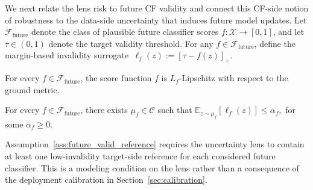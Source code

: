 



We next relate the lens risk to future CF validity and connect this
CF-side notion of robustness to the data-side uncertainty that induces
future model updates.
Let $\mathcal{F}_{\mathrm{future}}$ denote the class of plausible future
classifier scores $f:\mathcal{X}\to[0,1]$, and let
$\tau\in(0,1)$ denote the target validity threshold.
For any $f\in\mathcal{F}_{\mathrm{future}}$, define the margin-based
invalidity surrogate
$\
    \ell_f(z)
    :=
    [\tau-f(z)]_+.
    \label{eq:invalidity_surrogate}
$

\begin{assumption}
\label{ass:lipschitz_future}
For every $f\in\mathcal{F}_{\mathrm{future}}$, the score function $f$ is
$L_f$-Lipschitz with respect to the ground metric.
\end{assumption}

\begin{assumption}
\label{ass:future_valid_reference}
For every $f\in\mathcal{F}_{\mathrm{future}}$, there exists
$\mu_f\in\mathcal{C}$ such that
$
    \mathbb{E}_{z\sim\mu_f}
    \left[
        \ell_f(z)
    \right]
    \leq
    \alpha_f,
    \label{eq:future_valid_reference}
$
for some $\alpha_f\geq0$.
\end{assumption}

Assumption~\ref{ass:future_valid_reference} requires the uncertainty lens
to contain at least one low-invalidity target-side reference for each
considered future classifier. This is a modeling condition on the lens
rather than a consequence of the deployment calibration in
Section~\ref{sec:calibration}.


